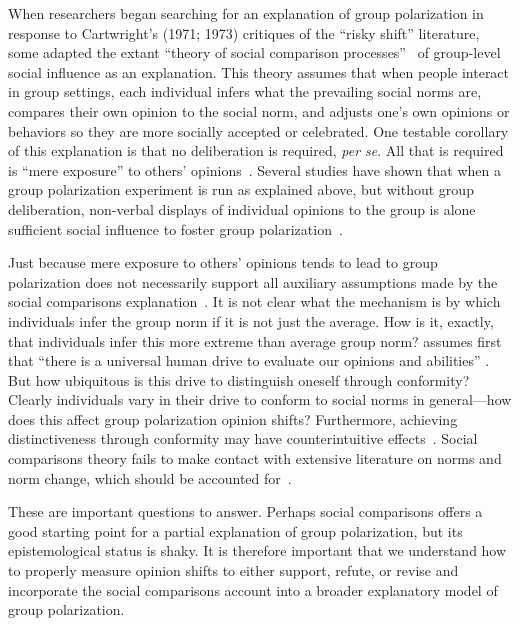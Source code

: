 When researchers began searching for an explanation of group polarization
in response to Cartwright's (1971; 1973) critiques of the ``risky shift'' literature, 
some adapted the extant ``theory of social comparison processes''~\cite{Festinger1954} of group-level
social influence as an explanation. This theory assumes that when people
interact in group settings, each individual infers what the prevailing
social norms are, compares their own opinion to the social norm, and adjusts 
one's own opinions or behaviors so they are more socially accepted or celebrated. 
One testable corollary of this explanation is that no deliberation is required, \emph{per se}.
All that is required is ``mere exposure'' to others' 
opinions~\cite{Zajonc1968,Burgess1971,Bornstein1990,Montoya2017}. Several studies
have shown that when a group polarization experiment is run as explained above,
but without group deliberation, non-verbal displays of individual opinions 
to the group is alone sufficient social influence to foster group 
polarization~\cite{Teger1967,Blascovich1973,Blascovich1975,Blascovich1976,Sanders1977,Myers1978,Myers1982}.

Just because mere exposure to others' opinions tends to lead to group polarization
does not necessarily support all auxiliary assumptions made by the
social comparisons explanation~\cite{Meehl1990}. It is not clear what the
mechanism is by which individuals infer the group norm if it is not just the
average. How is it, exactly, that individuals infer this more extreme than
average group norm?  assumes first that ``there is a 
universal human drive to evaluate our opinions and abilities'' \cite[p. 78]{Brown2000}.
But how ubiquitous is this drive to distinguish oneself through conformity?
Clearly individuals vary in their drive to conform to social norms in general---how
does this affect group polarization opinion shifts?
Furthermore, achieving distinctiveness through conformity may have counterintuitive
effects~\cite{Smaldino2015a}. Social comparisons theory fails to make contact
with extensive literature on norms and norm change, which should be accounted
for~\cite{Bicchieri2006,Bicchieri2014,Bicchieri2017}.

These are important questions to answer. Perhaps social comparisons offers a
good starting point for a partial explanation of group polarization, but 
its epistemological status is shaky. It is therefore important that we
understand how to properly measure opinion shifts to either support,
refute, or revise and incorporate the social comparisons account into a 
broader explanatory model of group polarization.


